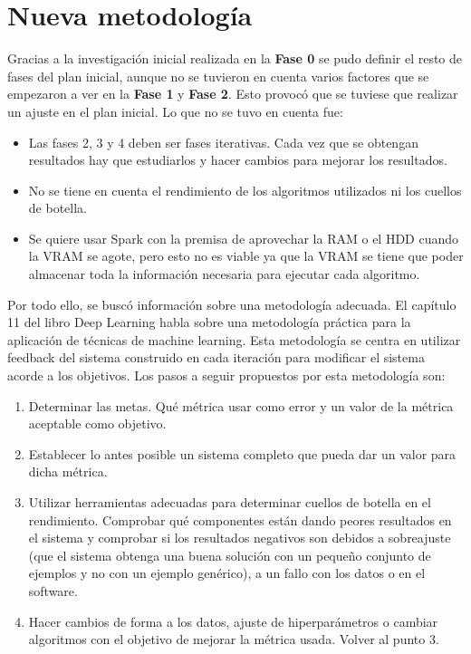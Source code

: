 \section{Nueva metodología}\label{sec:metodologia}

Gracias a la investigación inicial realizada en la \textbf{Fase 0} se pudo definir el resto de fases del plan inicial, aunque no se tuvieron en cuenta varios factores que se empezaron a ver en la \textbf{Fase 1} y \textbf{Fase 2}. Esto provocó que se tuviese que realizar un ajuste en el plan inicial. 
Lo que no se tuvo en cuenta fue:

\begin{itemize}
\item Las fases 2, 3 y 4 deben ser fases iterativas. Cada vez que se obtengan resultados hay que estudiarlos y hacer cambios para mejorar los resultados.
\item No se tiene en cuenta el rendimiento de los algoritmos utilizados ni los cuellos de botella.
\item Se quiere usar Spark con la premisa de aprovechar la RAM o el HDD cuando la VRAM se agote, pero esto no es viable ya que la VRAM se tiene que poder almacenar toda la información necesaria para ejecutar cada algoritmo.
\end{itemize}

Por todo ello, se buscó información sobre una metodología adecuada. El capítulo 11 del libro Deep Learning \cite{Goodfellow2016} habla sobre una metodología práctica para la aplicación de técnicas de machine learning. Esta metodología se centra en utilizar feedback del sistema construido en cada iteración para modificar el sistema acorde a los objetivos. Los pasos a seguir propuestos por esta metodología son:

\begin{enumerate}
\item Determinar las metas. Qué métrica usar como error y un valor de la métrica aceptable como objetivo.
\item Establecer lo antes posible un sistema completo que pueda dar un valor para dicha métrica.
\item Utilizar herramientas adecuadas para determinar cuellos de botella en el rendimiento. Comprobar qué componentes están dando peores resultados en el sistema y comprobar si los resultados negativos son debidos a sobreajuste (que el sistema obtenga una buena solución con un pequeño conjunto de ejemplos y no con un ejemplo genérico), a un fallo con los datos o en el software.
\item Hacer cambios de forma a los datos, ajuste de hiperparámetros o cambiar algoritmos con el objetivo de mejorar la métrica usada. Volver al punto 3.
\end{enumerate}

